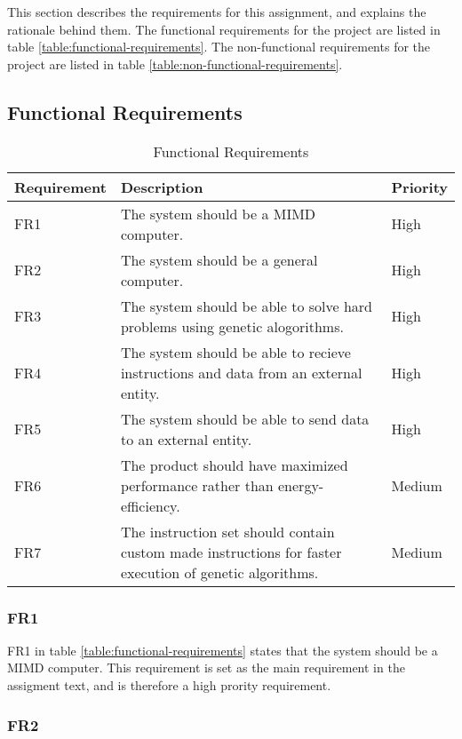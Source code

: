 This section describes the requirements for this assignment, and explains the rationale behind them.
The functional requirements for the project are listed in table \vref{table:functional-requirements}.
The non-functional requirements for the project are listed in table \vref{table:non-functional-requirements}.

 \subsection{Functional Requirements}

 \begin{table}[H]
 \begin{center}
 \begin{tabular}{| l | p{7cm} | l |}
 \hline
 Requirement & Description & Priority\\
 \hline
 FR1 & The system should be a MIMD computer. & High \\
 FR2 & The system should be a general computer. & High \\
 FR3 & The system should be able to solve hard problems using genetic alogorithms. & High \\
 FR4 & The system should be able to recieve instructions and data from an external entity. & High \\
 FR5 & The system should be able to send data to an external entity. & High \\
 FR6 & The product should have maximized performance rather than energy-efficiency. & Medium \\
 FR7 & The instruction set should contain custom made instructions for faster execution of genetic algorithms. & Medium \\
 \hline
 \end{tabular}
 \caption{Functional Requirements}
 \label{table:functional-requirements}
 \end{center}
 \end{table}

\subsubsection{FR1}

FR1 in table \vref{table:functional-requirements} states that the system should be a MIMD computer.
This requirement is set as the main requirement in the assigment text, and is therefore a high prority requirement.

\subsubsection{FR2}

